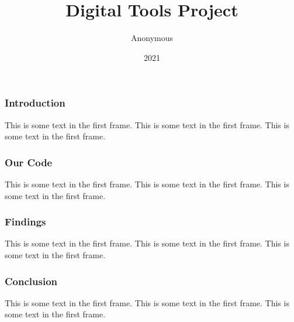 \documentclass{beamer}
\title{Digital Tools Project}
\author{Anonymous}
\institute{Overleaf}
\date{2021}
\begin{document}
\frame{\titlepage}

\begin{frame}
\frametitle{Introduction}
This is some text in the first frame. This is some text in the first frame. This is some text in the first frame.
\end{frame}

\begin{frame}
    \frametitle{Our Code}
    This is some text in the first frame. This is some text in the first frame. This is some text in the first frame.
\end{frame}

\begin{frame}
    \frametitle{Findings}
    This is some text in the first frame. This is some text in the first frame. This is some text in the first frame.
\end{frame}

\begin{frame}
    \frametitle{Conclusion}
    This is some text in the first frame. This is some text in the first frame. This is some text in the first frame.
\end{frame}
\end{document}
